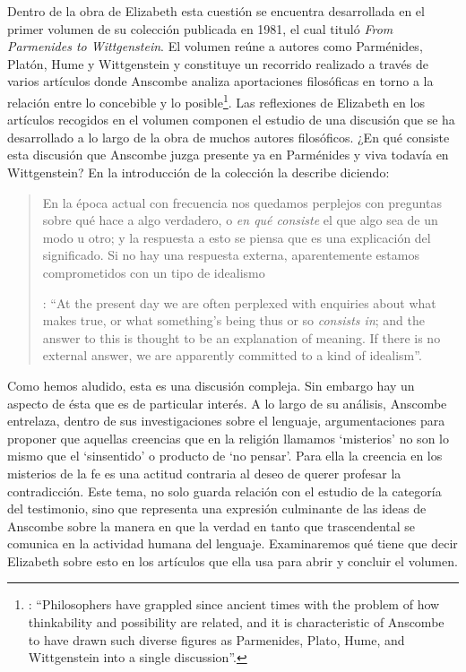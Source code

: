 Dentro de la obra de Elizabeth esta cuestión se encuentra desarrollada en el primer volumen de su colección publicada en 1981, el cual tituló \emph{From Parmenides to Wittgenstein}. El volumen reúne a autores como Parménides, Platón, Hume y Wittgenstein y constituye un recorrido realizado a través de varios artículos donde Anscombe analiza aportaciones filosóficas en torno a la relación entre lo concebible y lo posible\footnote{\cite[Cf.][193]{teichmann2008ans}: \enquote{Philosophers have grappled since ancient times with the problem of how thinkability and possibility are related, and it is characteristic of Anscombe to have drawn such diverse figures as Parmenides, Plato, Hume, and Wittgenstein into a single discussion}.}. Las reflexiones de Elizabeth en los artículos recogidos en el volumen componen el estudio de una discusión que se ha desarrollado a lo largo de la obra de muchos autores filosóficos. ¿En qué consiste esta discusión que Anscombe juzga presente ya en Parménides y viva todavía en Wittgenstein? En la introducción de la colección la describe diciendo: 
\blockquote[{\Cite[xi]{anscombe1981parmenides}}: \enquote{At the present day we are often perplexed with enquiries about what makes true, or what something's being thus or so \emph{consists in}; and the answer to this is thought to be an explanation of meaning. If there is no external answer, we are apparently committed to a kind of idealism}.]{En la época actual con frecuencia nos quedamos perplejos con preguntas sobre qué hace a algo verdadero, o \emph{en qué consiste} el que algo sea de un modo u otro; y la respuesta a esto se piensa que es una explicación del significado. Si no hay una respuesta externa, aparentemente estamos comprometidos con un tipo de idealismo}.\label{subsec:intextq}

Como hemos aludido, esta es una discusión compleja. Sin embargo hay un aspecto de ésta que es de particular interés. A lo largo de su análisis, Anscombe entrelaza, dentro de sus investigaciones sobre el lenguaje, argumentaciones para proponer que aquellas creencias que en la religión llamamos `misterios' no son lo mismo que el `sinsentido' o producto de `no pensar'. Para ella la creencia en los misterios de la fe es una actitud contraria al deseo de querer profesar la contradicción. Este tema, no solo guarda relación con el estudio de la categoría del testimonio, sino que representa una expresión culminante de las ideas de Anscombe sobre la manera en que la verdad en tanto que trascendental se comunica en la actividad humana del lenguaje. Examinaremos qué tiene que decir Elizabeth sobre esto en los artículos que ella usa para abrir y concluir el volumen.

